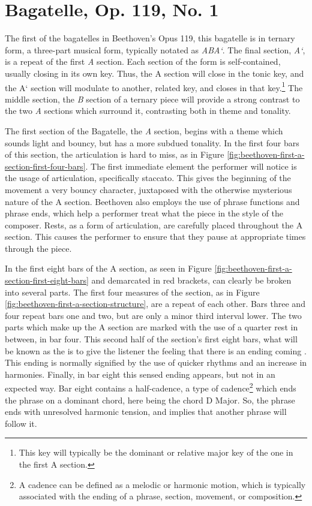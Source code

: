 \section{Bagatelle, Op. 119, No. 1}
The first of the bagatelles in Beethoven's Opus 119, this bagatelle is in ternary form, a three-part musical form, typically notated as \textit{ABA`}. The final section, \textit{A`}, is a repeat of the first \textit{A} section. Each section of the form is self-contained, usually closing in its own key\autocite{Tucker_Cochrane_2011}. Thus, the A section will close in the tonic key, and the A` section will modulate to another, related key, and closes in that key.\footnote{This key will typically be the dominant or relative major key of the one in the first A section.} The middle section, the \textit{B} section of a ternary piece will provide a strong contrast to the two \textit{A} sections which surround it, contrasting both in theme and tonality.

The first section of the Bagatelle, the \textit{A} section, begins with a theme which sounds light and bouncy, but has a more subdued tonality. In the first four bars of this section, the articulation is hard to miss, as in Figure \ref{fig:beethoven-first-a-section-first-four-bars}. The first immediate element the performer will notice is the usage of articulation, specifically staccato. This gives the beginning of the movement a very bouncy character, juxtaposed with the otherwise mysterious nature of the A section. Beethoven also employs the use of phrase functions and phrase ends, which help a performer treat what the piece  in the style of the composer. Rests, as a form of articulation, are carefully placed throughout the A section. This causes the performer to ensure that they pause at appropriate times through the piece. 

In the first eight bars of the A section, as seen in Figure \ref{fig:beethoven-first-a-section-first-eight-bars}\autocite{Henle_1978} and demarcated in red brackets, can clearly be broken into several parts. The first four measures of the section, as in Figure \ref{fig:beethoven-first-a-section-structure}\autocite{Henle_1978}, are a repeat of each other. Bars three and four repeat bars one and two, but are only a minor third interval lower. The two parts which make up the A section are marked with the use of a quarter rest in between, in bar four. This second half of the section's first eight bars, what will be known as the  is to give the listener the feeling that there is an ending coming \autocite{Kerman_Tyson_Burnham_Johnson_Drabkin_2001}. This ending is normally signified by the use of quicker rhythms and an increase in harmonies. Finally, in bar eight this sensed ending appears, but not in an expected way. Bar eight contains a half-cadence, a type of cadence\footnote{A cadence can be defined as a melodic or harmonic motion, which is typically associated with the ending of a phrase, section, movement, or composition.}\autocite{Nagley_Whittall_2011} which ends the phrase on a dominant chord, here being the chord D Major. So, the phrase ends with unresolved harmonic tension, and implies that another phrase will follow it.

